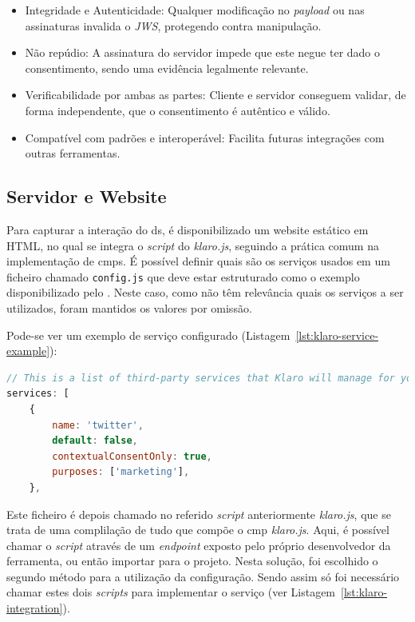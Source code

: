 \begin{itemize}
  \item Integridade e Autenticidade: Qualquer modificação no \textit{payload} ou nas assinaturas invalida o \textit{JWS}, protegendo contra manipulação.
  \item Não repúdio: A assinatura do servidor impede que este negue ter dado o consentimento, sendo uma evidência legalmente relevante.
  \item Verificabilidade por ambas as partes: Cliente e servidor conseguem validar, de forma independente, que o consentimento é autêntico e válido.
  \item Compatível com padrões e interoperável: Facilita futuras integrações com outras ferramentas.
\end{itemize}


\subsection{Servidor e Website}

Para capturar a interação do \acrshort{ds}, é disponibilizado um website estático em HTML, no qual se integra o \textit{script} do \textit{klaro.js}, seguindo a prática comum na implementação de \acrshort{cmp}s.
É possível definir quais são os serviços usados em um ficheiro chamado \texttt{config.js} que deve estar estruturado como o exemplo disponibilizado pelo \cite{gitklaro}. Neste caso, como não têm relevância quais os serviços a ser utilizados, foram mantidos os valores por omissão.

Pode-se ver um exemplo de serviço configurado (Listagem~\ref{lst:klaro-service-example}):


\begin{lstlisting}[language=Javascript, caption={Exemplo de serviço configurado no \textit{klaro.js}}, label={lst:klaro-service-example}]
// This is a list of third-party services that Klaro will manage for you.
services: [
	{
		name: 'twitter',
		default: false,
		contextualConsentOnly: true,
		purposes: ['marketing'],
	},
\end{lstlisting}

Este ficheiro é depois chamado no referido \textit{script} anteriormente \textit{klaro.js}, que se trata de uma complilação de tudo que compõe o \acrshort{cmp} \textit{klaro.js}. Aqui, é possível chamar o \textit{script} através de um \textit{endpoint} exposto pelo próprio desenvolvedor da ferramenta, ou então importar para o projeto. Nesta solução, foi escolhido o segundo método para a utilização da configuração.
Sendo assim só foi necessário chamar estes dois \textit{scripts} para implementar o serviço (ver Listagem~\ref{lst:klaro-integration}).

